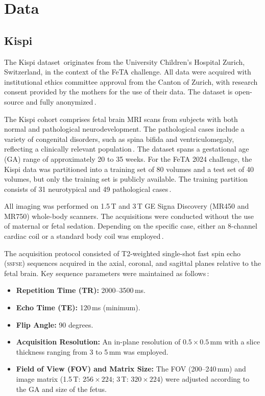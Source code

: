 \chapter{Data} \label{chap:Data}
\vspace{1cm}


\section{Kispi}
The Kispi dataset\,\cite{FeTA_MICCAI} originates from the University Children's Hospital Zurich, Switzerland, in the context of the FeTA challenge. All data were acquired with institutional ethics committee approval from the Canton of Zurich, with research consent provided by the mothers for the use of their data. The dataset is open-source and fully anonymized\,\cite{FeTA2024_paper}.

The Kispi cohort comprises fetal brain MRI scans from subjects with both normal and pathological neurodevelopment. The pathological cases include a variety of congenital disorders, such as spina bifida and ventriculomegaly, reflecting a clinically relevant population\,\cite{FeTA2024_paper, Ciceri2024}. The dataset spans a gestational age (GA) range of approximately 20 to 35 weeks. For the FeTA 2024 challenge, the Kispi data was partitioned into a training set of 80 volumes and a test set of 40 volumes, but only the training set is publicly available. The training partition consists of 31 neurotypical and 49 pathological cases\,\cite{FeTA2024_review}.

All imaging was performed on 1.5\,T and 3\,T GE Signa Discovery (MR450 and MR750) whole-body scanners. The acquisitions were conducted without the use of maternal or fetal sedation. Depending on the specific case, either an 8-channel cardiac coil or a standard body coil was employed\,\cite{FeTA2024_paper}.

The acquisition protocol consisted of T2-weighted single-shot fast spin echo (\textsc{ssfse}) sequences acquired in the axial, coronal, and sagittal planes relative to the fetal brain. Key sequence parameters were maintained as follows\,\cite{FeTA2024_paper}:
\begin{itemize}
    \item \textbf{Repetition Time (TR):} 2000--3500\,ms.
    \item \textbf{Echo Time (TE):} 120\,ms (minimum).
    \item \textbf{Flip Angle:} 90 degrees.
    \item \textbf{Acquisition Resolution:} An in-plane resolution of $0.5 \times 0.5$\,mm with a slice thickness ranging from 3 to 5\,mm was employed.
    \item \textbf{Field of View (FOV) and Matrix Size:} The FOV (200--240\,mm) and image matrix (1.5\,T: $256 \times 224$; 3\,T: $320 \times 224$) were adjusted according to the GA and size of the fetus.
\end{itemize}

